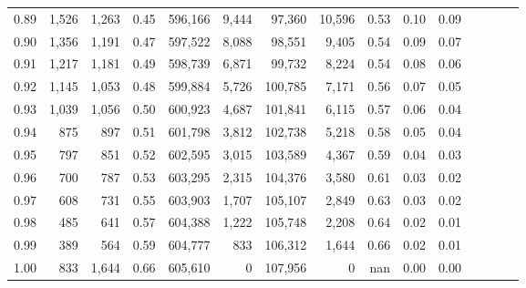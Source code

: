 \begin{tabular}{rrrcrrrrrrrrrrr}
0.89 &   1,526 &  1,263 &                                       0.45 &  596,166 &    9,444 &   97,360 &   10,596 &  0.53 &  0.10 &                         0.09 \\
0.90 &   1,356 &  1,191 &                                       0.47 &  597,522 &    8,088 &   98,551 &    9,405 &  0.54 &  0.09 &                         0.07 \\
0.91 &   1,217 &  1,181 &                                       0.49 &  598,739 &    6,871 &   99,732 &    8,224 &  0.54 &  0.08 &                         0.06 \\
0.92 &   1,145 &  1,053 &                                       0.48 &  599,884 &    5,726 &  100,785 &    7,171 &  0.56 &  0.07 &                         0.05 \\
0.93 &   1,039 &  1,056 &                                       0.50 &  600,923 &    4,687 &  101,841 &    6,115 &  0.57 &  0.06 &                         0.04 \\
0.94 &     875 &    897 &                                       0.51 &  601,798 &    3,812 &  102,738 &    5,218 &  0.58 &  0.05 &                         0.04 \\
0.95 &     797 &    851 &                                       0.52 &  602,595 &    3,015 &  103,589 &    4,367 &  0.59 &  0.04 &                         0.03 \\
0.96 &     700 &    787 &                                       0.53 &  603,295 &    2,315 &  104,376 &    3,580 &  0.61 &  0.03 &                         0.02 \\
0.97 &     608 &    731 &                                       0.55 &  603,903 &    1,707 &  105,107 &    2,849 &  0.63 &  0.03 &                         0.02 \\
0.98 &     485 &    641 &                                       0.57 &  604,388 &    1,222 &  105,748 &    2,208 &  0.64 &  0.02 &                         0.01 \\
0.99 &     389 &    564 &                                       0.59 &  604,777 &      833 &  106,312 &    1,644 &  0.66 &  0.02 &                         0.01 \\
1.00 &     833 &  1,644 &                                       0.66 &  605,610 &        0 &  107,956 &        0 &   nan &  0.00 &                         0.00 \\
\bottomrule
\end{tabular}
